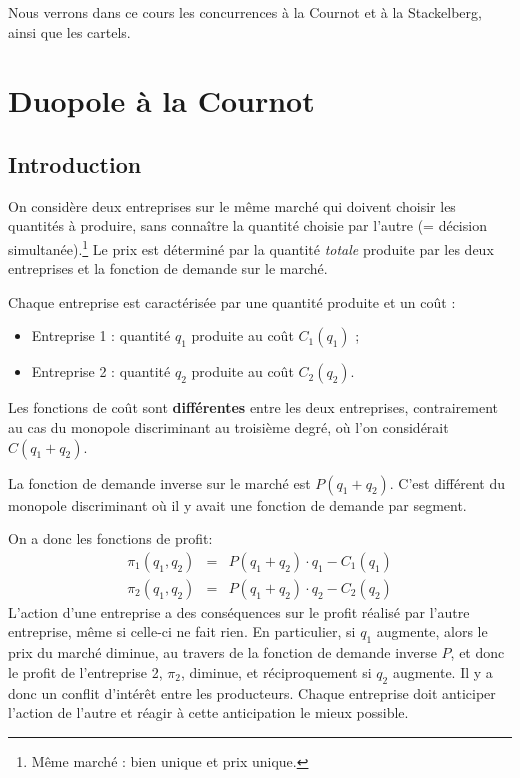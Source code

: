 \documentclass[
  a4paper,
]{book}
\providecommand{\tightlist}{%
  \setlength{\itemsep}{0pt}\setlength{\parskip}{0pt}}
\theoremstyle{definition}
\theoremstyle{definition}
\theoremstyle{definition}
\theoremstyle{definition}
\theoremstyle{remark}
\begin{document}
Nous verrons dans ce cours les concurrences à la Cournot et à la Stackelberg, ainsi que les cartels.

\hypertarget{duopole-uxe0-la-cournot}{%
\section{Duopole à la Cournot}\label{duopole-uxe0-la-cournot}}

\hypertarget{introduction}{%
\subsection{Introduction}\label{introduction}}

On considère deux entreprises sur le même marché qui doivent choisir les quantités à produire, sans connaître la quantité choisie par l'autre (= décision simultanée).\footnote{Même marché : bien unique et prix unique.}
Le prix est déterminé par la quantité \emph{totale} produite par les deux entreprises et la fonction de demande sur le marché.

Chaque entreprise est caractérisée par une quantité produite et un coût :

\begin{itemize}
\tightlist
\item
  Entreprise 1 : quantité \(q_1\) produite au coût \(C_1(q_1)\) ;
\item
  Entreprise 2 : quantité \(q_2\) produite au coût \(C_2(q_2)\).
\end{itemize}

Les fonctions de coût sont \textbf{différentes} entre les deux entreprises, contrairement au cas du monopole discriminant au troisième degré, où l'on considérait \(C(q_1+q_2)\).

La fonction de demande inverse sur le marché est \(P(q_1+q_2)\).
C'est différent du monopole discriminant où il y avait une fonction de demande par segment.

On a donc les fonctions de profit:
\[
\begin{array}{rcl}
\pi_1(q_1, q_2) &=& P(q_1+q_2)\cdot q_1-C_1(q_1)\\
\pi_2(q_1, q_2) &=& P(q_1+q_2)\cdot q_2-C_2(q_2)
\end{array}
\]
L'action d'une entreprise a des conséquences sur le profit réalisé par l'autre entreprise, même si celle-ci ne fait rien.
En particulier, si \(q_1\) augmente, alors le prix du marché diminue, au travers de la fonction de demande inverse \(P\), et donc le profit de l'entreprise 2, \(\pi_2\), diminue, et réciproquement si \(q_2\) augmente.
Il y a donc un conflit d'intérêt entre les producteurs.
Chaque entreprise doit anticiper l'action de l'autre et réagir à cette anticipation le mieux possible.
\end{document}
